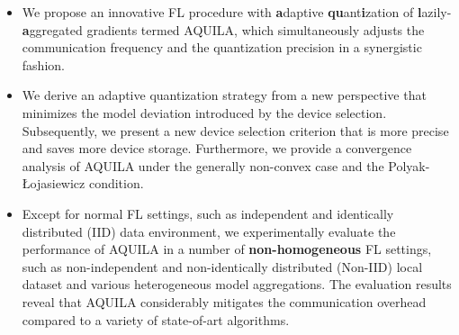 \documentclass[lettersize,journal]{IEEEtran}
\begin{document}


\begin{itemize}
\setlength{\parsep}{0.5ex}
    \item We propose an innovative FL procedure with \textbf{a}daptive \textbf{qu}ant\textbf{i}zation of \textbf{l}azily-\textbf{a}ggregated gradients termed AQUILA, which simultaneously adjusts the communication frequency and the quantization precision in a synergistic fashion.
    
    \item We derive an adaptive quantization strategy from a new perspective that minimizes the model deviation introduced by the device selection. Subsequently, we present a new device selection criterion that is more precise and saves more device storage. Furthermore, we provide a convergence analysis of AQUILA under the generally non-convex case and the Polyak-Łojasiewicz condition.
    
    \item Except for normal FL settings, such as independent and identically distributed (IID) data environment, we experimentally evaluate the performance of AQUILA in a number of \textbf{non-homogeneous} FL settings, such as non-independent and non-identically distributed (Non-IID) local dataset and various heterogeneous model aggregations. The evaluation results reveal that AQUILA considerably mitigates the communication overhead compared to a variety of state-of-art algorithms.
\end{itemize}
\end{document}
